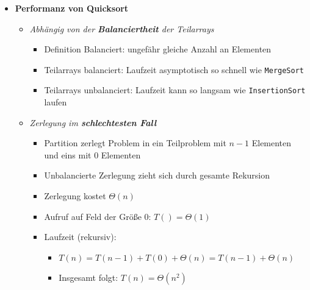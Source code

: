 \begin{itemize}
        \item \textbf{Performanz von Quicksort}
            \begin{itemize}
                \item \textit{Abhängig von der \textbf{Balanciertheit} der Teilarrays} 
                    \begin{itemize}
                        \item Definition Balanciert: ungefähr gleiche Anzahl an Elementen
                        \item Teilarrays balanciert: Laufzeit asymptotisch so schnell wie \texttt{MergeSort}
                        \item Teilarrays unbalanciert: Laufzeit kann so langsam wie \texttt{InsertionSort} laufen
                    \end{itemize}

                \item \textit{Zerlegung im \textbf{schlechtesten Fall}}
                    \begin{itemize}
                        \item Partition zerlegt Problem in ein Teilproblem mit $n-1$ Elementen und eins mit $0$ Elementen
                        \item Unbalancierte Zerlegung zieht sich durch gesamte Rekursion
                        \item Zerlegung kostet $\Theta(n)$
                        \item Aufruf auf Feld der Größe 0: $T() = \Theta(1)$
                        \item Laufzeit (rekursiv):
                            \begin{itemize}
                                \item $T(n) = T(n-1) + T(0) + \Theta(n) = T(n-1) + \Theta(n)$
                                \item Insgesamt folgt: $T(n) = \Theta(n^2)$
                            \end{itemize}
                    \end{itemize}


\end{itemize}
\end{itemize}
